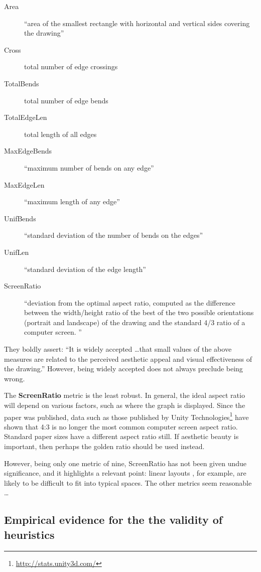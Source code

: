 \begin{itemize*}
\begin{description}
    \item[Area]
``area of the smallest rectangle with horizontal and vertical sides covering the drawing''
    \item[Cross]
total number of edge crossings
    \item[TotalBends]
total number of edge bends
    \item[TotalEdgeLen]
total length of all edges
    \item[MaxEdgeBends]
``maximum number of bends on any edge''
    \item[MaxEdgeLen]
``maximum length of any edge''
    \item[UnifBends]
``standard deviation of the number of bends on the edges''
    \item[UnifLen]
``standard deviation of the edge length''
    \item[ScreenRatio]
``deviation from the optimal aspect ratio, computed as the difference between the width/height ratio of the best of the two possible orientations (portrait and landscape) of the drawing and the standard 4/3 ratio of a computer screen. ''
\end{description}

They boldly assert: ``It is widely accepted \ldots that small values of the above measures are related to the perceived aesthetic appeal and visual effectiveness of the drawing.''
However, being widely accepted does not always preclude being wrong.

The \textbf{ScreenRatio} metric is the least robust.
In general, the ideal aspect ratio will depend on various factors, such as where the graph is displayed.
Since the paper was published, data such as those published by Unity Technologies\footnote{\url{http://stats.unity3d.com/}} have shown that 4:3 is no longer the most common computer screen aspect ratio.
Standard paper sizes have a different aspect ratio still.
If aesthetic beauty is important, then perhaps the golden ratio  should be used instead.

However, being only one metric of nine, ScreenRatio has not been given undue significance, and it highlights a relevant point: linear layouts , for example, are likely to be difficult to fit into typical spaces.
The other metrics seem reasonable \ldots


\subsection{Empirical evidence for the the validity of heuristics}


\end{itemize*}
